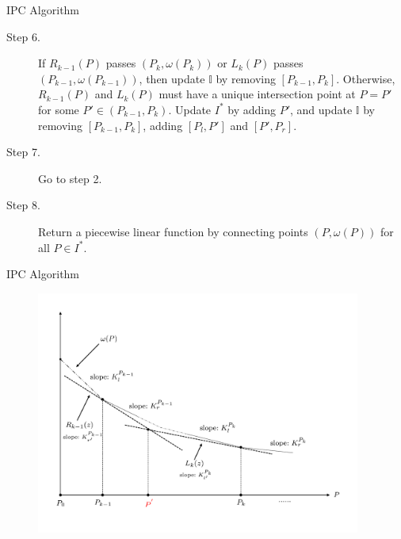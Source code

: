 \documentclass[14pt]{beamer}
\begin{document}
\begin{frame}{IPC Algorithm}
	\begin{description}
	\justifying
	\footnotesize
  \item[Step 6.] If $R_{k-1}(P)$ passes $(P_{k},\omega(P_{k}))$ or $L_{k}(P)$ passes $(P_{k-1},\omega(P_{k-1}))$, then update $\mathbb{I}$ by removing $[P_{k-1},P_{k}]$.
  Otherwise, $R_{k-1}(P)$ and $L_{k}(P)$ must have a unique intersection point at $P=P'$ for some $P' \in (P_{k-1},P_{k})$.
  Update $I^*$ by adding $P'$, and update $\mathbb{I}$ by removing $[P_{k-1},P_{k}]$, adding $[P_l,P']$ and $[P',P_r]$.
  \item[Step 7.] Go to step 2.
  \item[Step 8.] Return a piecewise linear function by connecting points $(P,\omega(P))$ for all $P \in I^*$.
	\end{description}
\end{frame}



\begin{frame}{IPC Algorithm}
	\vspace{-3mm}
	\begin{figure}[H]
	\centering
	\includegraphics[width=0.95\textwidth]{Figures/IPC}
	\end{figure}
	\centering
\end{frame}
\end{document}
